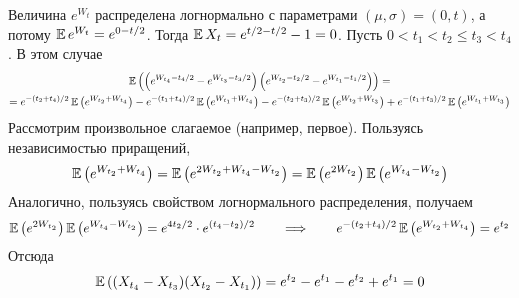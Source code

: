 \begin{solution}
    Величина $ e^{W_t} $ распределена логнормально с параметрами $ (\mu, \sigma) = (0, t) $, а потому $ \operatorname{\mathbb{E}} e^{W_t} = e^{0-t/2} $.
    Тогда $ \operatorname{\mathbb{E}} X_t = e^{t/2 - t/2} - 1 = 0 $.
    Пусть $ 0 < t_1 < t_2 \leqslant t_3 < t_4 $.
    В этом случае
    \begin{multline*}
        \operatorname{\mathbb{E}} \left( \left( e^{W_{t_4} - t_4/2} - e^{W_{t_3} - t_3/2} \right) \left( e^{W_{t_2} - t_2/2} - e^{W_{t_1} - t_1/2} \right) \right) = \\
        = e^{-(t_2 + t_4)/2} \operatorname{\mathbb{E}} \left( e^{W_{t_2} + W_{t_4}} \right) - e^{-(t_1 + t_4)/2} \operatorname{\mathbb{E}} \left( e^{W_{t_1} + W_{t_4}} \right)
        - e^{-(t_2 + t_3)/2} \operatorname{\mathbb{E}} \left( e^{W_{t_2} + W_{t_3}} \right) + e^{-(t_1 + t_3)/2} \operatorname{\mathbb{E}} \left( e^{W_{t_1} + W_{t_3}} \right)
    \end{multline*}
    Рассмотрим произвольное слагаемое (например, первое).
    Пользуясь независимостью приращений,
    \[
        \operatorname{\mathbb{E}} \left( e^{W_{t_2} + W_{t_4}} \right) = \operatorname{\mathbb{E}} \left( e^{2 W_{t_2} + W_{t_4} - W_{t_2}} \right) = \operatorname{\mathbb{E}} \left( e^{2 W_{t_2}} \right) \operatorname{\mathbb{E}} \left( e^{W_{t_4} - W_{t_2}} \right)
    \]
    Аналогично, пользуясь свойством логнормального распределения, получаем
    \[
        \operatorname{\mathbb{E}} \left( e^{2 W_{t_2}} \right) \operatorname{\mathbb{E}} \left( e^{W_{t_4} - W_{t_2}} \right) = e^{4 t_2 / 2} \cdot e^{(t_4 - t_2) / 2}
        \qquad \Longrightarrow \qquad
        e^{-(t_2 + t_4)/2} \operatorname{\mathbb{E}} \left( e^{W_{t_2} + W_{t_4}} \right) = e^{t_2}
    \]
    Отсюда
    \[
        \operatorname{\mathbb{E}} \left( (X_{t_4} - X_{t_3})(X_{t_2} - X_{t_1}) \right) = e^{t_2} - e^{t_1} - e^{t_2} + e^{t_1} = 0
    \]
\end{solution}

